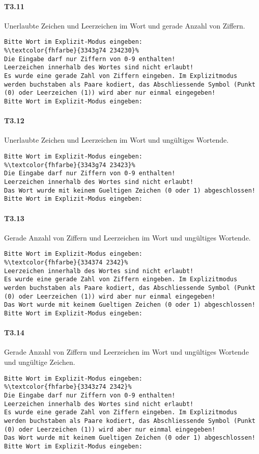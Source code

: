 \paragraph*{T3.11} Unerlaubte Zeichen und Leerzeichen im Wort und gerade Anzahl von Ziffern.
\begin{lstlisting}[escapechar=\%]
Bitte Wort im Explizit-Modus eingeben:
%\textcolor{fhfarbe}{3343g74 234230}%
Die Eingabe darf nur Ziffern von 0-9 enthalten!
Leerzeichen innerhalb des Wortes sind nicht erlaubt!
Es wurde eine gerade Zahl von Ziffern eingeben. Im Explizitmodus werden buchstaben als Paare kodiert, das Abschliessende Symbol (Punkt (0) oder Leerzeichen (1)) wird aber nur einmal eingegeben!
Bitte Wort im Explizit-Modus eingeben:
\end{lstlisting}

\paragraph*{T3.12} Unerlaubte Zeichen und Leerzeichen im Wort und ungültiges Wortende.
\begin{lstlisting}[escapechar=\%]
Bitte Wort im Explizit-Modus eingeben:
%\textcolor{fhfarbe}{3343g74 23423}%
Die Eingabe darf nur Ziffern von 0-9 enthalten!
Leerzeichen innerhalb des Wortes sind nicht erlaubt!
Das Wort wurde mit keinem Gueltigen Zeichen (0 oder 1) abgeschlossen!
Bitte Wort im Explizit-Modus eingeben:
\end{lstlisting}

\paragraph*{T3.13} Gerade Anzahl von Ziffern und Leerzeichen im Wort und ungültiges Wortende.
\begin{lstlisting}[escapechar=\%]
Bitte Wort im Explizit-Modus eingeben:
%\textcolor{fhfarbe}{334374 2342}%
Leerzeichen innerhalb des Wortes sind nicht erlaubt!
Es wurde eine gerade Zahl von Ziffern eingeben. Im Explizitmodus werden buchstaben als Paare kodiert, das Abschliessende Symbol (Punkt (0) oder Leerzeichen (1)) wird aber nur einmal eingegeben!
Das Wort wurde mit keinem Gueltigen Zeichen (0 oder 1) abgeschlossen!
Bitte Wort im Explizit-Modus eingeben:
\end{lstlisting}

\paragraph*{T3.14} Gerade Anzahl von Ziffern und Leerzeichen im Wort und ungültiges Wortende und ungültige Zeichen.
\begin{lstlisting}[escapechar=\%]
Bitte Wort im Explizit-Modus eingeben:
%\textcolor{fhfarbe}{3343z74 2342}%
Die Eingabe darf nur Ziffern von 0-9 enthalten!
Leerzeichen innerhalb des Wortes sind nicht erlaubt!
Es wurde eine gerade Zahl von Ziffern eingeben. Im Explizitmodus werden buchstaben als Paare kodiert, das Abschliessende Symbol (Punkt (0) oder Leerzeichen (1)) wird aber nur einmal eingegeben!
Das Wort wurde mit keinem Gueltigen Zeichen (0 oder 1) abgeschlossen!
Bitte Wort im Explizit-Modus eingeben:
\end{lstlisting}

